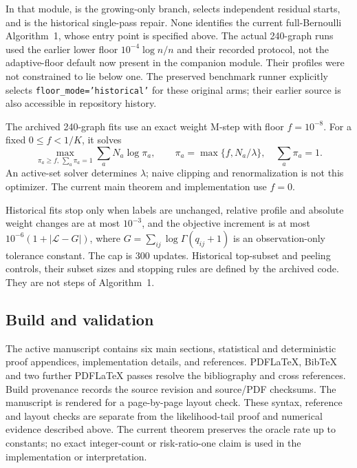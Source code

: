 \documentclass[11pt]{article}
\theoremstyle{definition}
\theoremstyle{remark}
\numberwithin{equation}{section}
\begin{document}
In that module,  is the growing-only branch,  selects independent residual starts, and  is the historical single-pass repair. None identifies the current full-Bernoulli Algorithm~1, whose entry point is specified above. The actual 240-graph runs used the earlier lower floor $10^{-4}\log n/n$ and their recorded protocol, not the adaptive-floor default now present in the companion module. Their profiles were not constrained to lie below one. The preserved benchmark runner explicitly selects \texttt{floor\_mode='historical'} for these original arms; their earlier source is also accessible in repository history.

The archived 240-graph fits use an exact weight M-step with floor $f=10^{-8}$. For a fixed $0\le f<1/K$, it solves
\[
 \max_{\pi_a\ge f,\,\sum_a\pi_a=1}\sum_aN_a\log\pi_a,
 \qquad \pi_a=\max\{f,N_a/\lambda\},
 \quad\sum_a\pi_a=1.
\]
An active-set solver determines $\lambda$; naive clipping and renormalization is not this optimizer. The current main theorem and implementation use $f=0$.

Historical fits stop only when labels are unchanged, relative profile and absolute weight changes are at most $10^{-3}$, and the objective increment is at most $10^{-6}(1+|\mathcal L-G|)$, where $G=\sum_{ij}\log\Gamma(q_{ij}+1)$ is an observation-only tolerance constant. The cap is 300 updates. Historical top-subset and peeling controls, their subset sizes and stopping rules are defined by the archived code. They are not steps of Algorithm~1.

\subsection{Build and validation}
The active manuscript contains six main sections, statistical and deterministic proof appendices, implementation details, and references. PDFLaTeX, BibTeX and two further PDFLaTeX passes resolve the bibliography and cross references. Build provenance records the source revision and source/PDF checksums. The manuscript is rendered for a page-by-page layout check. These syntax, reference and layout checks are separate from the likelihood-tail proof and numerical evidence described above. The current theorem preserves the oracle rate up to constants; no exact integer-count or risk-ratio-one claim is used in the implementation or interpretation.




\end{document}
